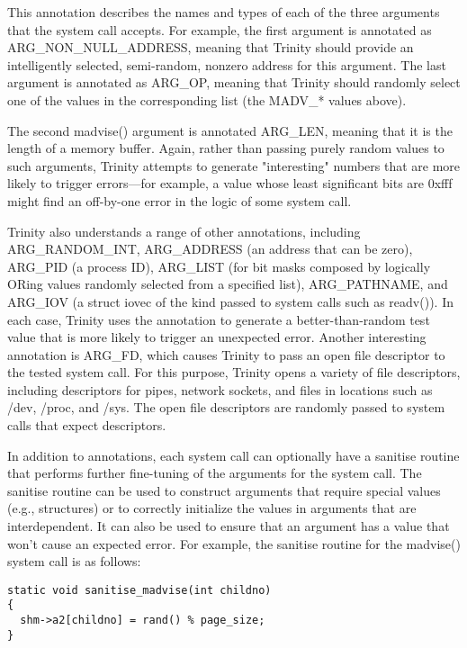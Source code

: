 \documentclass[twoside]{article}
\begin{document}
\begin{multicols}{2}
{\begin{lstlisting}
\end{lstlisting}
\par}
    
This annotation describes the names and types of each of the three arguments that the system call accepts. For example, the first argument is annotated as ARG\_NON\_NULL\_ADDRESS, meaning that Trinity should provide an intelligently selected, semi-random, nonzero address for this argument. The last argument is annotated as ARG\_OP, meaning that Trinity should randomly select one of the values in the corresponding list (the MADV\_* values above).

The second madvise() argument is annotated ARG\_LEN, meaning that it is the length of a memory buffer. Again, rather than passing purely random values to such arguments, Trinity attempts to generate "interesting" numbers that are more likely to trigger errors—for example, a value whose least significant bits are 0xfff might find an off-by-one error in the logic of some system call.

Trinity also understands a range of other annotations, including ARG\_RANDOM\_INT, ARG\_ADDRESS (an address that can be zero), ARG\_PID (a process ID), ARG\_LIST (for bit masks composed by logically ORing values randomly selected from a specified list), ARG\_PATHNAME, and ARG\_IOV (a struct iovec of the kind passed to system calls such as readv()). In each case, Trinity uses the annotation to generate a better-than-random test value that is more likely to trigger an unexpected error. Another interesting annotation is ARG\_FD, which causes Trinity to pass an open file descriptor to the tested system call. For this purpose, Trinity opens a variety of file descriptors, including descriptors for pipes, network sockets, and files in locations such as /dev, /proc, and /sys. The open file descriptors are randomly passed to system calls that expect descriptors.

In addition to annotations, each system call can optionally have a sanitise routine that performs further fine-tuning of the arguments for the system call. The sanitise routine can be used to construct arguments that require special values (e.g., structures) or to correctly initialize the values in arguments that are interdependent. It can also be used to ensure that an argument has a value that won't cause an expected error. For example, the sanitise routine for the madvise() system call is as follows:

{\footnotesize
\begin{lstlisting}
static void sanitise_madvise(int childno)
{
  shm->a2[childno] = rand() % page_size;
} 
\end{lstlisting}
\par}
    

\end{multicols}
\end{document}
